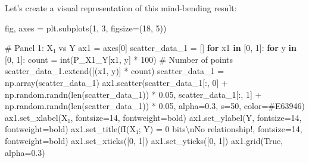 \documentclass[
  11pt,
  letterpaper,
  oneside,
  openany]{book}
\newenvironment{Shaded}{\begin{snugshade}}{\end{snugshade}}
\newcommand{\BuiltInTok}[1]{\textcolor[rgb]{0.00,0.23,0.31}{#1}}
\newcommand{\CharTok}[1]{\textcolor[rgb]{0.13,0.47,0.30}{#1}}
\newcommand{\CommentTok}[1]{\textcolor[rgb]{0.37,0.37,0.37}{#1}}
\newcommand{\ControlFlowTok}[1]{\textcolor[rgb]{0.00,0.23,0.31}{\textbf{#1}}}
\newcommand{\DecValTok}[1]{\textcolor[rgb]{0.68,0.00,0.00}{#1}}
\newcommand{\FloatTok}[1]{\textcolor[rgb]{0.68,0.00,0.00}{#1}}
\newcommand{\KeywordTok}[1]{\textcolor[rgb]{0.00,0.23,0.31}{\textbf{#1}}}
\newcommand{\NormalTok}[1]{\textcolor[rgb]{0.00,0.23,0.31}{#1}}
\newcommand{\OperatorTok}[1]{\textcolor[rgb]{0.37,0.37,0.37}{#1}}
\newcommand{\SpecialStringTok}[1]{\textcolor[rgb]{0.13,0.47,0.30}{#1}}
\newcommand{\StringTok}[1]{\textcolor[rgb]{0.13,0.47,0.30}{#1}}
\newcommand{\VariableTok}[1]{\textcolor[rgb]{0.07,0.07,0.07}{#1}}
\begin{document}
Let's create a visual representation of this mind-bending result:

\begin{Shaded}
\begin{Highlighting}[]
\NormalTok{fig, axes }\OperatorTok{=}\NormalTok{ plt.subplots(}\DecValTok{1}\NormalTok{, }\DecValTok{3}\NormalTok{, figsize}\OperatorTok{=}\NormalTok{(}\DecValTok{18}\NormalTok{, }\DecValTok{5}\NormalTok{))}

\CommentTok{\# Panel 1: X₁ vs Y}
\NormalTok{ax1 }\OperatorTok{=}\NormalTok{ axes[}\DecValTok{0}\NormalTok{]}
\NormalTok{scatter\_data\_1 }\OperatorTok{=}\NormalTok{ []}
\ControlFlowTok{for}\NormalTok{ x1 }\KeywordTok{in}\NormalTok{ [}\DecValTok{0}\NormalTok{, }\DecValTok{1}\NormalTok{]:}
    \ControlFlowTok{for}\NormalTok{ y }\KeywordTok{in}\NormalTok{ [}\DecValTok{0}\NormalTok{, }\DecValTok{1}\NormalTok{]:}
\NormalTok{        count }\OperatorTok{=} \BuiltInTok{int}\NormalTok{(P\_X1\_Y[x1, y] }\OperatorTok{*} \DecValTok{100}\NormalTok{)  }\CommentTok{\# Number of points}
\NormalTok{        scatter\_data\_1.extend([(x1, y)] }\OperatorTok{*}\NormalTok{ count)}
\NormalTok{scatter\_data\_1 }\OperatorTok{=}\NormalTok{ np.array(scatter\_data\_1)}
\NormalTok{ax1.scatter(scatter\_data\_1[:, }\DecValTok{0}\NormalTok{] }\OperatorTok{+}\NormalTok{ np.random.randn(}\BuiltInTok{len}\NormalTok{(scatter\_data\_1)) }\OperatorTok{*} \FloatTok{0.05}\NormalTok{, }
\NormalTok{            scatter\_data\_1[:, }\DecValTok{1}\NormalTok{] }\OperatorTok{+}\NormalTok{ np.random.randn(}\BuiltInTok{len}\NormalTok{(scatter\_data\_1)) }\OperatorTok{*} \FloatTok{0.05}\NormalTok{,}
\NormalTok{            alpha}\OperatorTok{=}\FloatTok{0.3}\NormalTok{, s}\OperatorTok{=}\DecValTok{50}\NormalTok{, color}\OperatorTok{=}\StringTok{\textquotesingle{}\#E63946\textquotesingle{}}\NormalTok{)}
\NormalTok{ax1.set\_xlabel(}\StringTok{\textquotesingle{}X₁\textquotesingle{}}\NormalTok{, fontsize}\OperatorTok{=}\DecValTok{14}\NormalTok{, fontweight}\OperatorTok{=}\StringTok{\textquotesingle{}bold\textquotesingle{}}\NormalTok{)}
\NormalTok{ax1.set\_ylabel(}\StringTok{\textquotesingle{}Y\textquotesingle{}}\NormalTok{, fontsize}\OperatorTok{=}\DecValTok{14}\NormalTok{, fontweight}\OperatorTok{=}\StringTok{\textquotesingle{}bold\textquotesingle{}}\NormalTok{)}
\NormalTok{ax1.set\_title(}\SpecialStringTok{f\textquotesingle{}I(X₁; Y) = 0 bits}\CharTok{\textbackslash{}n}\SpecialStringTok{No relationship!\textquotesingle{}}\NormalTok{, fontsize}\OperatorTok{=}\DecValTok{14}\NormalTok{, fontweight}\OperatorTok{=}\StringTok{\textquotesingle{}bold\textquotesingle{}}\NormalTok{)}
\NormalTok{ax1.set\_xticks([}\DecValTok{0}\NormalTok{, }\DecValTok{1}\NormalTok{])}
\NormalTok{ax1.set\_yticks([}\DecValTok{0}\NormalTok{, }\DecValTok{1}\NormalTok{])}
\NormalTok{ax1.grid(}\VariableTok{True}\NormalTok{, alpha}\OperatorTok{=}\FloatTok{0.3}\NormalTok{)}


\end{Highlighting}
\end{Shaded}
\end{document}
